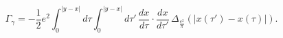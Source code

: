 \begin{equation}
\Gamma_\gamma=-\frac{1}{2}e^2\int_0^{|y-x|} d\tau \int_0^{|y-x|} d\tau'\, 
\frac{dx}{d\tau} \cdot \frac{dx}{d\tau'}\,
\Delta_{\frac{e^2}{\pi}}\left(|x(\tau')-x(\tau)|\right).
\label{int}
\end{equation}

